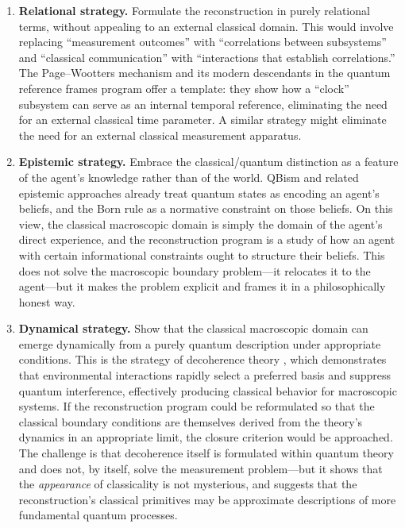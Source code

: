 \documentclass[pdflatex,sn-mathphys-num]{sn-jnl}%
\begin{document}
\begin{enumerate}
\item \textbf{Relational strategy.} Formulate the reconstruction in purely relational terms, without appealing to an external classical domain. This would involve replacing ``measurement outcomes'' with ``correlations between subsystems'' and ``classical communication'' with ``interactions that establish correlations.'' The Page--Wootters mechanism \cite{PageWootters1983} and its modern descendants in the quantum reference frames program \cite{Giacomini2019,delaHamette2021} offer a template: they show how a ``clock'' subsystem can serve as an internal temporal reference, eliminating the need for an external classical time parameter. A similar strategy might eliminate the need for an external classical measurement apparatus.

\item \textbf{Epistemic strategy.} Embrace the classical/quantum distinction as a feature of the agent's knowledge rather than of the world. QBism \cite{Fuchs2010} and related epistemic approaches already treat quantum states as encoding an agent's beliefs, and the Born rule as a normative constraint on those beliefs. On this view, the classical macroscopic domain is simply the domain of the agent's direct experience, and the reconstruction program is a study of how an agent with certain informational constraints ought to structure their beliefs. This does not solve the macroscopic boundary problem---it relocates it to the agent---but it makes the problem explicit and frames it in a philosophically honest way.

\item \textbf{Dynamical strategy.} Show that the classical macroscopic domain can emerge dynamically from a purely quantum description under appropriate conditions. This is the strategy of decoherence theory \cite{Zurek2003,Schlosshauer2007}, which demonstrates that environmental interactions rapidly select a preferred basis and suppress quantum interference, effectively producing classical behavior for macroscopic systems. If the reconstruction program could be reformulated so that the classical boundary conditions are themselves derived from the theory's dynamics in an appropriate limit, the closure criterion would be approached. The challenge is that decoherence itself is formulated within quantum theory and does not, by itself, solve the measurement problem---but it shows that the \emph{appearance} of classicality is not mysterious, and suggests that the reconstruction's classical primitives may be approximate descriptions of more fundamental quantum processes.
\end{enumerate}
\end{document}
